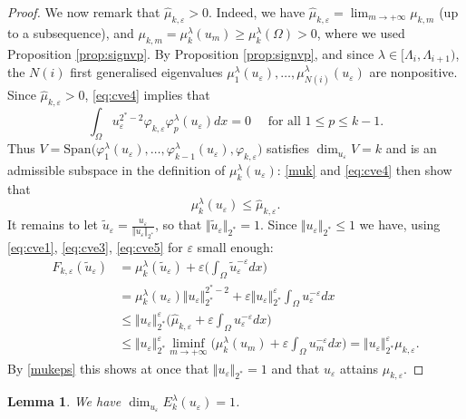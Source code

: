 \documentclass[10pt]{amsart}
\numberwithin{equation}{section}
\newcommand{\ve}{\varepsilon}
\newcommand{\vp}{\varphi}
\newcommand{\Om}{\Omega}
\newcommand{\mkl}{\mu_{k}^{\lambda}}
\newcommand{\mkle}{\mu_{k,\ve}}
\newcommand{\Fke}{F_{k,\ve}}
\theoremstyle{plain}
\newtheorem{lemme}{Lemma}[section]%
\theoremstyle{remark}
\begin{document}
\begin{proof}
We now remark that $\hat{\mu}_{k,\ve} >0$. Indeed, we have $\hat{\mu}_{k,\ve} =  \lim_{m \to + \infty} \mu_{k,m}$ (up to a subsequence), and $\mu_{k,m} = \mkl(u_m) \ge \mkl(\Om) >0$, where we used Proposition \ref{prop:signvp}. By Proposition \ref{prop:signvp}, and since $\lambda \in [\Lambda_i, \Lambda_{i+1})$, the $N(i)$ first generalised eigenvalues $\mu_1^{\lambda}(u_\ve), \dots, \mu_{N(i)}^{\lambda}(u_\ve)$ are nonpositive. Since $\hat{\mu}_{k,\ve} >0$, \eqref{eq:cve4} implies that 
$$ \int_{\Om} u_\ve^{2^*-2} \vp_{k,\ve} \vp_p^{\lambda}(u_\ve)dx = 0 \quad \text{ for all } 1 \le p \le k-1. $$
Thus $V =  \text{Span} \big( \vp_1^{\lambda}(u_\ve), \dots, \vp_{k-1}^\lambda(u_\ve), \vp_{k,\ve}\big) $ satisfies $\dim_{u_\ve} V = k$ and is an admissible subspace in the definition of $\mkl(u_\ve)$: \eqref{muk} and \eqref{eq:cve4} then show that 
\begin{equation} \label{eq:cve5}
\mkl(u_\ve) \le \hat{\mu}_{k,\ve}.
\end{equation}
 It remains to let $ \tilde{u}_\ve = \frac{u_\ve}{\Vert u_\ve \Vert_{2^*}}$, so that $\Vert \tilde{u}_\ve \Vert_{2^*} = 1$. Since $\Vert u_\ve \Vert_{2^*} \le 1$ we have, using \eqref{eq:cve1},  \eqref{eq:cve3}, \eqref{eq:cve5} for $\ve$ small enough:
$$ \begin{aligned}
\Fke(\tilde{u}_\ve) & =  \mkl(\tilde{u}_\ve) + \ve  \Big(\int_{\Om} \tilde{u}_\ve^{-\ve}dx \Big)\\
& = \mkl(u_\ve) \Vert u_\ve \Vert_{2^*}^{2^*-2} + \ve \Vert u_\ve \Vert_{2^*}^{\ve} \int_{\Om}u_\ve^{-\ve}dx \\
& \le \Vert u_\ve \Vert_{2^*}^{\ve}\Big( \hat{\mu}_{k,\ve} + \ve \int_{\Om} u_\ve^{-\ve}dx \Big) \\
& \le \Vert u_\ve \Vert_{2^*}^{\ve}\liminf_{m \to + \infty} \Big(  \mkl(u_m) + \ve \int_{\Om} u_m^{-\ve}dx \Big)  = \Vert u_\ve \Vert_{2^*}^{\ve} \mkle.
\end{aligned} $$
By \eqref{mukeps} this shows at once that $\Vert u_\ve \Vert_{2^*} = 1$ and that $u_\ve$ attains $\mkle$. 
\end{proof}

\begin{lemme} \label{lemme4}
We have $\dim_{u_\ve} E_k^\lambda(u_\ve) = 1$. 
\end{lemme}
\end{document}

